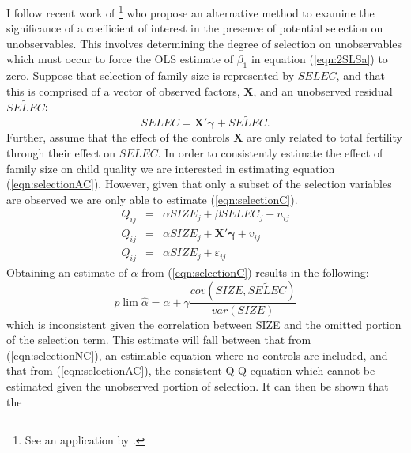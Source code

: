 \documentclass{article}[11pt,subeqn]
\newcommand{\vect}[1]{\mathbf{#1}}
\begin{document}
\begin{spacing}{1.5}
I follow recent work of \citet{Altonjietal2005, Altonjietal2008}\footnote{See an application by \citet{BellowsMiguel2008}.} who propose an alternative method to examine the significance of a coefficient of interest in the presence of 
potential selection on unobservables.  This involves determining the degree of selection on unobservables which must occur to force the OLS estimate of $\beta_1$ in equation 
(\ref{eqn:2SLSa}) to zero.  %
Suppose that selection of family size is represented by $SELEC$, and that this is comprised of a vector of observed factors, $\vect{X}$, and an unobserved residual $\widetilde{SELEC}$:  %
\begin{equation}
SELEC=\vect{X'\gamma}+ \widetilde{SELEC}.
\end{equation}
Further, assume that the effect of the controls $\vect{X}$ are only related to total fertility through their effect on $SELEC$.   In order to consistently estimate the effect of 
family size on child quality we are interested in estimating equation 
(\ref{eqn:selectionAC}).  However, given that only a subset of the selection variables are observed we are only able to estimate (\ref{eqn:selectionC}).
\begin{subequations}
\label{eqn:selection}
\begin{eqnarray}
Q_{ij}&=&\alpha SIZE_{j}+\beta SELEC_j+u_{ij} \label{eqn:selectionAC}\\
Q_{ij}&=&\alpha SIZE_{j}+\vect{X'\gamma}+v_{ij} \label{eqn:selectionC}\\
Q_{ij}&=&\alpha SIZE_{j}+\varepsilon_{ij} \label{eqn:selectionNC}
\end{eqnarray}
\end{subequations}
Obtaining an estimate of $\alpha$ from (\ref{eqn:selectionC}) results in the following:
\begin{equation}
\label{eqn:biasC}
 p\lim \hat\alpha=\alpha + \gamma\frac{cov(SIZE,\widetilde{SELEC})}{var(SIZE)}
\end{equation}
which is inconsistent given the correlation between SIZE and the omitted portion of the selection term.  This estimate will fall between that from (\ref{eqn:selectionNC}), an estimable equation where
no controls are included, and that from (\ref{eqn:selectionAC}), the consistent Q-Q equation which cannot be estimated given the unobserved portion of selection.  It can then be shown that the

\end{spacing}
\end{document}
